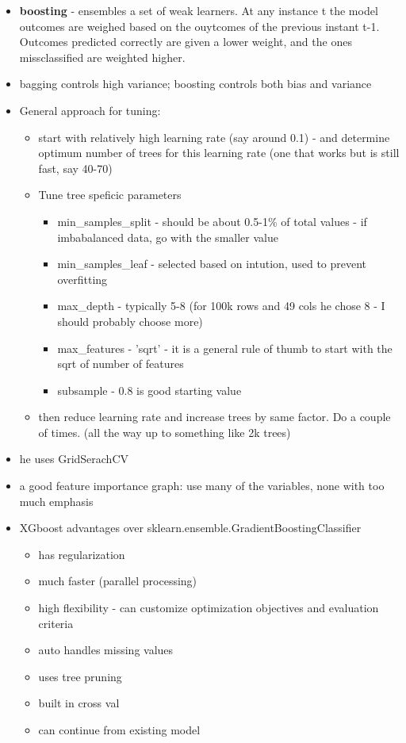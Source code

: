 \documentclass[a4paper]{report}
\begin{document}
\begin{itemize}
  \item {\bf boosting} - ensembles a set of weak learners. At any instance t the model outcomes are weighed based on the ouytcomes of the previous instant t-1. Outcomes predicted correctly are given a lower weight, and the ones missclassified are weighted higher.
  \item bagging controls high variance; boosting controls both bias and variance
  \item General approach for tuning:
    \begin{itemize}
      \item start with relatively high learning rate (say around 0.1) - and determine optimum number of trees for this learning rate (one that works but is still fast, say 40-70)
      \item Tune tree speficic parameters
	\begin{itemize}
	  \item min\_samples\_split - should be about 0.5-1\% of total values  - if imbabalanced data, go with the smaller value
	  \item min\_samples\_leaf - selected based on intution, used to prevent overfitting
	  \item max\_depth - typically 5-8 (for 100k rows and 49 cols he chose 8 - I should probably choose more)
	  \item max\_features - 'sqrt' - it is a general rule of thumb to start with the sqrt of number of features
	  \item subsample  - 0.8 is good starting value
	\end{itemize}
      \item then reduce learning rate and increase trees by same factor. Do a couple of times. (all the way up to something like 2k trees)
    \end{itemize}
  \item he uses GridSerachCV
  \item a good feature importance graph: use many of the variables, none with too much emphasis
  \item XGboost advantages over sklearn.ensemble.GradientBoostingClassifier
    \begin{itemize}
      \item has regularization
      \item much faster (parallel processing)
      \item high flexibility - can customize optimization objectives and evaluation criteria
      \item auto handles missing values
      \item uses tree pruning
      \item built in cross val
      \item can continue from existing model
    \end{itemize}
\end{itemize}	
\end{document}
